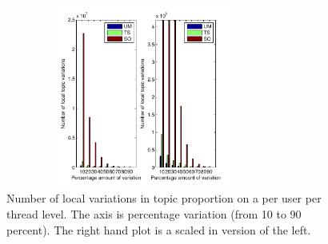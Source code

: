 \documentclass{sig-alternate}
\begin{document}
\begin{figure}
\begin{center}
\includegraphics[height=6cm,width=9cm]{TopicVariationsLocal.pdf}
\end{center}
\caption{Number of local variations in topic proportion on a per user per thread
level. The axis is percentage variation (from 10 to 90 percent). The right hand
plot is a scaled in version of the left.}
\label{fig:localTopicVariations}
\end{figure}
\end{document}
